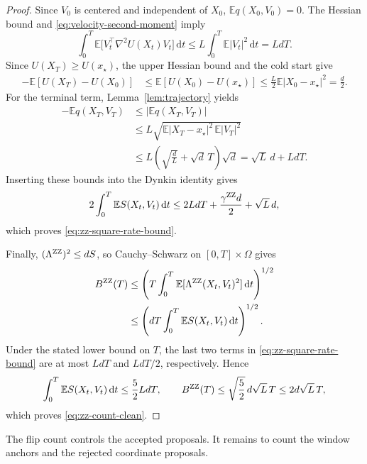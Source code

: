 \documentclass{amsart}
\theoremstyle{plain}
\theoremstyle{definition}
\theoremstyle{remark}
\newcommand{\ud}{\,\mathrm{d}}
\newcommand{\EE}{\mathbb{E}}
\newcommand{\abs}[1]{\lvert#1\rvert}
\newcommand{\E}{\EE}
\newcommand{\1}{\mathbf 1}
\newcommand{\dd}{\ud}
\newcommand{\zz}{{\rm ZZ}}
\begin{document}
\begin{proof}
Since $V_0$ is centered and independent of $X_0$,
$\E q(X_0,V_0)=0$.  The Hessian bound and
\eqref{eq:velocity-second-moment} imply
\[
        \int_0^T\E\bigl[V_t^\top\nabla^2U(X_t)V_t\bigr]\dd t
        \le L\int_0^T\E\abs{V_t}^2\dd t
        =LdT.
\]
Since $U(X_T)\ge U(x_\star)$, the upper Hessian bound and the cold start give
\[
\begin{aligned}
        -\E[U(X_T)-U(X_0)]
        &\le\E[U(X_0)-U(x_\star)]
        \le\frac{L}{2}
             \E\abs{X_0-x_\star}^2
        =\frac{d}{2}.
\end{aligned}
\]
For the terminal term, Lemma~\ref{lem:trajectory} yields
\[
\begin{aligned}
        -\E q(X_T,V_T)
        &\le\left|\E q(X_T,V_T)\right|\\
        &\le L
          \sqrt{\E\abs{X_T-x_\star}^2\,\E\abs{V_T}^2}\\
        &\le L\left(\sqrt{\frac dL}+\sqrt d\,T\right)\sqrt d=\sqrt L\,d+LdT.
\end{aligned}
\]
Inserting these bounds into the Dynkin identity gives
\[
        2\int_0^T\E S(X_t,V_t)\dd t
        \le 2LdT+\frac{\gamma^{\zz}d}{2}+\sqrt L\,d,
\]
which proves \eqref{eq:zz-square-rate-bound}.

Finally, $(\Lambda^{\zz})^2\le dS$, so Cauchy--Schwarz on
$[0,T]\times\Omega$ gives
\[
\begin{aligned}
        B^{\zz}(T)
        &\le\left(
          T\int_0^T\E[\Lambda^{\zz}(X_t,V_t)^2]\dd t
        \right)^{1/2}\\
        &\le\left(
          dT\int_0^T\E S(X_t,V_t)\dd t
        \right)^{1/2}.
\end{aligned}
\]
Under the stated lower bound on $T$, the last two terms in
\eqref{eq:zz-square-rate-bound} are at most $LdT$ and $LdT/2$,
respectively.  Hence
\[
        \int_0^T\E S(X_t,V_t)\dd t\le\frac52LdT,
        \qquad
        B^{\zz}(T)
        \le\sqrt{\frac52}\,d\sqrt L\,T
        \le2d\sqrt L\,T,
\]
which proves \eqref{eq:zz-count-clean}.
\end{proof}

The flip count controls the accepted proposals.  It remains to count the
window anchors and the rejected coordinate proposals.
\end{document}
